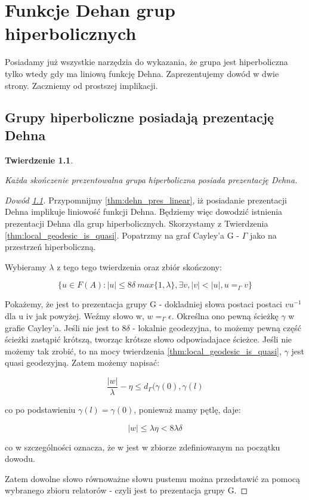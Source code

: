 \documentclass[licencjacka]{pracamgr}
\newtheorem{ther}{Twierdzenie}[section]
\begin{document}
\chapter{Funkcje Dehan grup hiperbolicznych}\label{Main proof}

Posiadamy już wszystkie narzędzia do wykazania, że grupa jest hiperboliczna tylko wtedy gdy ma liniową funkcję Dehna. Zaprezentujemy dowód w dwie strony. Zaczniemy od prostszej implikacji.

\section{Grupy hiperboliczne posiadają prezentację Dehna}

\begin{ther}\label{thm:hiper_linear}

Każda skończenie prezentowalna grupa hiperboliczna posiada prezentację Dehna.

\end{ther}

\begin{proof}[Dowód \ref{thm:hiper_linear}]

Przypomnijmy \ref{thm:dehn_pres_linear}, iż posiadanie prezentacji Dehna implikuje liniowość funkcji Dehna. Będziemy więc dowodzić istnienia prezentacji Dehna dla grup hiperbolicznych. Skorzystamy z Twierdzenia \ref{thm:local_geodesic_is_quasi}. Popatrzmy na graf Cayley'a G - $\Gamma$ jako na przestrzeń hiperboliczną.

Wybieramy $\lambda$ z tego tego twierdzenia oraz zbiór skończony:

\[ \{u \in F(A) : |u| \leq 8 \delta \  max \{1, \lambda \}, \exists v, |v| < |u|, u =_{\Gamma} v  \} \]

Pokażemy, że jest to prezentacja grupy G - dokladniej słowa postaci postaci $vu^{-1}$ dla u iv jak powyżej. Weźmy słowo w, $w =_{\Gamma} \epsilon$. Określna ono pewną ścieżkę $\gamma$ w grafie Cayley'a. Jeśli nie jest to $8 \delta$ - lokalnie geodezyjna, to możemy pewną część ścieżki zastąpić krótszą, tworząc krótsze słowo odpowiadajace ścieżce. Jeśli nie możemy tak zrobić, to na mocy twierdzenia \ref{thm:local_geodesic_is_quasi}, $\gamma$ jest quasi geodezyjną. Zatem możemy napisać:

\[ \frac{|w|}{\lambda} - \eta \leq d_{\Gamma}(\gamma(0), \gamma(l) \]

co po podstawieniu $\gamma(l) = \gamma(0)$, ponieważ mamy pętlę, daje:

\[ |w| \leq \lambda \eta < 8 \lambda \delta \]

co w szczególności oznacza, że w jest w zbiorze zdefiniowanym na początku dowodu.

Zatem dowolne słowo równoważne słowu pustemu można przedstawić za pomocą wybranego zbioru relatorów - czyli jest to prezentacja grupy G.


\end{proof}
\end{document}
